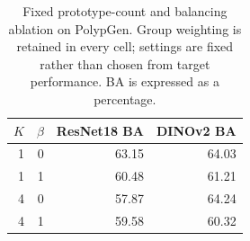 \begin{table}[t]\centering\small\begin{tabular}{rrrr}\toprule
$K$ & $\beta$ & ResNet18 BA & DINOv2 BA\\\midrule
1 & 0 & 63.15 & 64.03\\
1 & 1 & 60.48 & 61.21\\
4 & 0 & 57.87 & 64.24\\
4 & 1 & 59.58 & 60.32\\
\bottomrule\end{tabular}
\caption{Fixed prototype-count and balancing ablation on PolypGen. Group weighting is retained in every cell; settings are fixed rather than chosen from target performance. BA is expressed as a percentage.}
\label{tab:factorial}\end{table}
